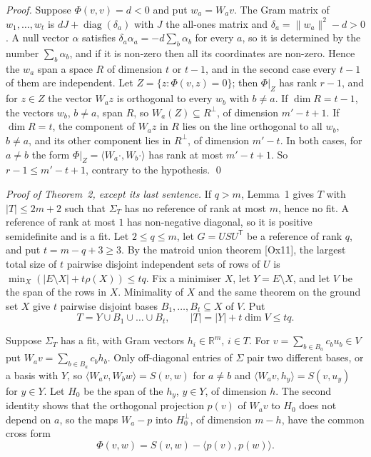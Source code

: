 \documentclass[11pt,letterpaper,reqno]{amsart}
\theoremstyle{spaced}
\begin{document}
\emph{Proof.} Suppose \(\Phi(v, v) = d < 0\) and put \(w_a = W_a v\). The Gram matrix of \(w_1, \dots, w_t\) is \(dJ + \operatorname{diag}(\delta_a)\) with \(J\) the all-ones matrix and \(\delta_a = \lVert w_a\rVert^2 - d > 0\). A null vector \(\alpha\) satisfies \(\delta_a \alpha_a = -d \sum_b \alpha_b\) for every \(a\), so it is determined by the number \(\sum_b \alpha_b\), and if it is non-zero then all its coordinates are non-zero. Hence the \(w_a\) span a space \(R\) of dimension \(t\) or \(t-1\), and in the second case every \(t-1\) of them are independent. Let \(Z = \{z : \Phi(v, z) = 0\}\); then \(\Phi|_Z\) has rank \(r - 1\), and for \(z \in Z\) the vector \(W_a z\) is orthogonal to every \(w_b\) with \(b \ne a\). If \(\dim R = t-1\), the vectors \(w_b\), \(b \ne a\), span \(R\), so \(W_a(Z) \subseteq R^{\perp}\), of dimension \(m' - t + 1\). If \(\dim R = t\), the component of \(W_a z\) in \(R\) lies on the line orthogonal to all \(w_b\), \(b \ne a\), and its other component lies in \(R^{\perp}\), of dimension \(m' - t\). In both cases, for \(a \ne b\) the form \(\Phi|_Z = \langle W_a \cdot, W_b \cdot\rangle\) has rank at most \(m' - t + 1\). So \(r - 1 \le m' - t + 1\), contrary to the hypothesis. \qed

\begingroup{} \emph{Proof of Theorem~2, except its last sentence.} If \(q > m\), Lemma~1 gives \(T\) with \(\lvert T\rvert \le 2m+2\) such that \(\Sigma_T\) has no reference of rank at most \(m\), hence no fit. A reference of rank at most \(1\) has non-negative diagonal, so it is positive semidefinite and is a fit. Let \(2 \le q \le m\), let \(G = U S U^{\mathsf T}\) be a reference of rank \(q\), and put \(t = m - q + 3 \ge 3\). By the matroid union theorem {[}Ox11{]}, the largest total size of \(t\) pairwise disjoint independent sets of rows of \(U\) is \(\min_X (\lvert E \setminus X\rvert + t\rho(X)) \le tq\). Fix a minimiser \(X\), let \(Y = E \setminus X\), and let \(V\) be the span of the rows in \(X\). Minimality of \(X\) and the same theorem on the ground set \(X\) give \(t\) pairwise disjoint bases \(B_1, \dots, B_t \subseteq X\) of \(V\). Put
\[T = Y \cup B_1 \cup \dots \cup B_t, \qquad \lvert T\rvert = \lvert Y\rvert + t \dim V \le tq.\]\par\endgroup

\begingroup{} Suppose \(\Sigma_T\) has a fit, with Gram vectors \(h_i \in \mathbb{R}^m\), \(i \in T\). For \(v = \sum_{b \in B_a} c_b u_b \in V\) put \(W_a v = \sum_{b \in B_a} c_b h_b\). Only off-diagonal entries of \(\Sigma\) pair two different bases, or a basis with \(Y\), so \(\langle W_a v, W_b w\rangle = S(v, w)\) for \(a \ne b\) and \(\langle W_a v, h_y\rangle = S(v, u_y)\) for \(y \in Y\). Let \(H_0\) be the span of the \(h_y\), \(y \in Y\), of dimension \(h\). The second identity shows that the orthogonal projection \(p(v)\) of \(W_a v\) to \(H_0\) does not depend on \(a\), so the maps \(W_a - p\) into \(H_0^{\perp}\), of dimension \(m - h\), have the common cross form
\[\Phi(v, w) = S(v, w) - \langle p(v), p(w)\rangle .\]\par\endgroup
\end{document}
